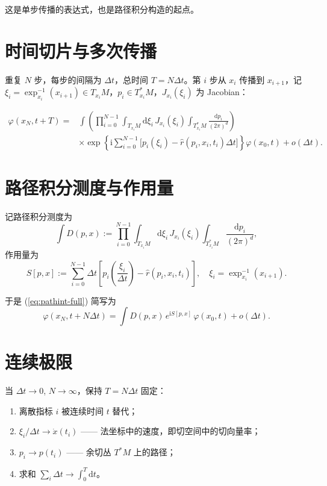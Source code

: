 \documentclass{book}
\newcommand{\assign}{:=}
\newcommand{\mathd}{\mathrm{d}}
\newcommand{\mathi}{\mathrm{i}}
\newcommand{\mathpi}{\pi}
\begin{document}
这是单步传播的表达式，也是路径积分构造的起点。

\section{时间切片与多次传播}

重复 $N$ 步，每步的间隔为 $\Delta t$，总时间 $T = N\Delta t$。第 $i$ 步从 $x_i$ 传播到 $x_{i+1}$，记 $\xi_i = \exp_{x_i}^{-1}(x_{i+1}) \in T_{x_i}M$，$p_i \in T_{x_i}^*M$，$J_{x_i}(\xi_i)$ 为 Jacobian：

\begin{align}
\varphi(x_N, t + T) = & \int \left( \prod_{i=0}^{N-1} \int_{T_{x_i}M} \mathd\xi_i \, J_{x_i}(\xi_i) \int_{T_{x_i}^*M} \frac{\mathd p_i}{(2\mathpi)^d} \right) \nonumber \\
& \times \exp\left\{ \mathi \sum_{i=0}^{N-1} \bigl[ p_i(\xi_i) - \hat{r}(p_i, x_i, t_i) \Delta t \bigr] \right\} \varphi(x_0, t) + o(\Delta t). \label{eq:pathint-full}
\end{align}

\section{路径积分测度与作用量}

记路径积分测度为
\begin{equation}
  \int D(p,x) \assign \prod_{i=0}^{N-1} \int_{T_{x_i}M} \mathd\xi_i \, J_{x_i}(\xi_i) \int_{T_{x_i}^*M} \frac{\mathd p_i}{(2\mathpi)^d},
\end{equation}
作用量为
\begin{equation}
  S[p,x] \assign \sum_{i=0}^{N-1} \Delta t \left[ p_i\!\left( \frac{\xi_i}{\Delta t} \right) - \hat{r}(p_i, x_i, t_i) \right], \quad \xi_i = \exp_{x_i}^{-1}(x_{i+1}). \label{eq:S-discrete}
\end{equation}

于是 (\ref{eq:pathint-full}) 简写为
\begin{equation}
  \varphi(x_N, t+N\Delta t) = \int D(p,x) \, e^{\mathi S[p,x]} \, \varphi(x_0, t) + o(\Delta t). \label{eq:pathint}
\end{equation}

\section{连续极限}

当 $\Delta t \to 0$, $N \to \infty$，保持 $T = N\Delta t$ 固定：

\begin{enumerate}
  \item 离散指标 $i$ 被连续时间 $t$ 替代；
  \item $\xi_i / \Delta t \to \dot{x}(t_i)$ —— 法坐标中的速度，即切空间中的切向量率；
  \item $p_i \to p(t_i)$ —— 余切丛 $T^*M$ 上的路径；
  \item 求和 $\sum_i \Delta t \to \int_0^T \mathd t$。
\end{enumerate}
\end{document}
